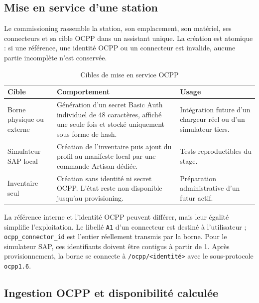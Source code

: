 \subsection{Mise en service d'une station}

Le commissioning rassemble la station, son emplacement, son matériel, ses
connecteurs et sa cible OCPP dans un assistant unique. La création est atomique :
si une référence, une identité OCPP ou un connecteur est invalide, aucune partie
incomplète n'est conservée.

\begin{table}[H]
  \centering
  \caption{Cibles de mise en service OCPP}
  \label{tab:commissioning-targets}
  \begin{tabularx}{\textwidth}{|p{3.5cm}|Y|Y|}
    \hline
    \textbf{Cible} & \textbf{Comportement} & \textbf{Usage}\\\hline

    Borne physique ou externe &
    Génération d'un secret Basic Auth individuel de 48 caractères, affiché une
    seule fois et stocké uniquement sous forme de hash. &
    Intégration future d'un chargeur réel ou d'un simulateur tiers.\\\hline
    Simulateur SAP local &
    Création de l'inventaire puis ajout du profil au manifeste local par une commande
    Artisan dédiée. &
    Tests reproductibles du stage.\\\hline
    Inventaire seul &
    Création sans identité ni secret OCPP. L'état reste non disponible jusqu'au
    provisioning. &
    Préparation administrative d'un futur actif.\\\hline

  \end{tabularx}
\end{table}

La référence interne et l'identité OCPP peuvent différer, mais leur égalité simplifie
l'exploitation. Le libellé \texttt{A1} d'un connecteur est destiné à l'utilisateur ;
\texttt{ocpp\_connector\_id} est l'entier réellement transmis par la borne. Pour le
simulateur SAP, ces identifiants doivent être contigus à partir de 1. Après
provisionnement, la borne se connecte à
\texttt{/ocpp/<identité>} avec le sous-protocole \texttt{ocpp1.6}.

\subsection{Ingestion OCPP et disponibilité calculée}

